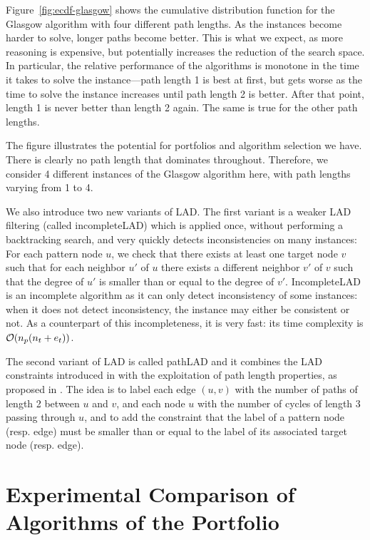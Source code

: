 \documentclass{llncs}
\begin{document}
Figure~\ref{fig:ecdf-glasgow} shows the cumulative distribution function for the
Glasgow algorithm with four different path lengths. As the instances become
harder to solve, longer paths become better. This is what we expect, as more
reasoning is expensive, but potentially increases the reduction of the search
space. In particular, the relative performance of the algorithms is monotone in
the time it takes to solve the instance---path length 1 is best at first, but
gets worse as the time to solve the instance increases until path length 2 is
better. After that point, length 1 is never better than length 2 again. The same
is true for the other path lengths.

The figure illustrates the potential for portfolios and algorithm selection we
have. There is clearly no path length that dominates throughout. Therefore, we
consider 4 different instances of the Glasgow algorithm here, with path lengths
varying from 1 to 4.


We also introduce two new variants of LAD. The first variant is a weaker LAD filtering (called incompleteLAD) which is applied once, without performing a backtracking search, and very quickly detects inconsistencies on many instances: For each pattern node $u$, we check that there exists at least one target node $v$ such that for each neighbor $u'$ of $u$ there exists a different neighbor $v'$ of $v$ such that the degree of $u'$ is smaller than or equal to the degree of $v'$. IncompleteLAD is an incomplete algorithm as it can only detect inconsistency of some instances: when it does not detect inconsistency, the instance may either be consistent or not. As a counterpart of this incompleteness, it is very fast: its time complexity is ${\cal O}(n_p(n_t+e_t))$.

The second variant of LAD is called pathLAD and it combines the LAD constraints introduced in \cite{Solnon:2010} with the exploitation of path length properties, as proposed in \cite{Audemard:2014}. The idea is to label each edge $(u,v)$ with the number of paths of length 2 between $u$ and $v$, and each node $u$ with the number of cycles of length 3 passing through $u$, and to add the constraint that the label of a pattern node (resp. edge) must be smaller than or equal to the label of its associated target node (resp. edge). 

\section{Experimental Comparison of Algorithms of the Portfolio}\label{expComp}
\end{document}
